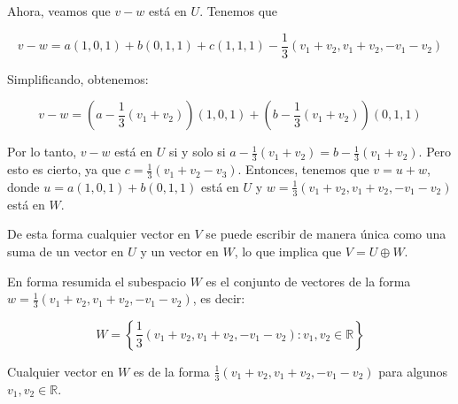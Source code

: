 Ahora, veamos que $v - w$ está en $U$. Tenemos que

$$v - w = a(1,0,1) + b(0,1,1) + c(1,1,1) - \frac{1}{3}(v_1 + v_2, v_1 + v_2, -v_1 - v_2)$$

Simplificando, obtenemos:

$$v - w = \left( a - \frac{1}{3}(v_1 + v_2)\right) (1,0,1) + \left( b - \frac{1}{3}(v_1 + v_2)\right) (0,1,1)$$

Por lo tanto, $v - w$ está en $U$ si y solo si $a - \frac{1}{3}(v_1 + v_2) = b - \frac{1}{3}(v_1 + v_2)$. Pero esto es cierto, ya que $c = \frac{1}{3}(v_1 + v_2 - v_3)$. Entonces, tenemos que $v = u + w$, donde $u = a(1,0,1) + b(0,1,1)$ está en $U$ y $w = \frac{1}{3}(v_1 + v_2, v_1 + v_2, -v_1 - v_2)$ está en $W$.

De esta forma cualquier vector en $V$ se puede escribir de manera única como una suma de un vector en $U$ y un vector en $W$, lo que implica que $V=U \oplus W$.


En forma resumida el subespacio $W$ es el conjunto de vectores de la forma $w = \frac{1}{3}(v_1 + v_2, v_1 + v_2, -v_1 - v_2)$, es decir:

$$W = \left\{ \frac{1}{3}(v_1 + v_2, v_1 + v_2, -v_1 - v_2) : v_1, v_2 \in \mathbb{R} \right\}$$

Cualquier vector en $W$ es de la forma $\frac{1}{3}(v_1 + v_2, v_1 + v_2, -v_1 - v_2)$ para algunos $v_1, v_2 \in \mathbb{R}$.



